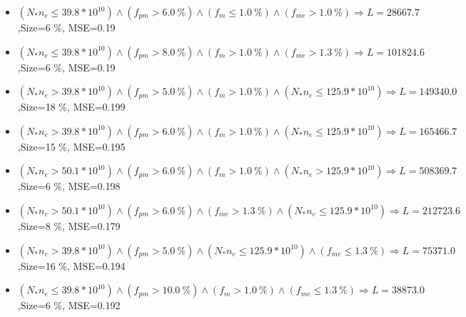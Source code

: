 \documentclass[numbered]{CSL}
\begin{document}
\begin{itemize}
\item $(N_* n_e \leq 39.8 * 10^{10}) \land (f_{pm} > 6.0~\%) \land (f_m \leq 1.0~\%) \land (f_{me} > 1.0~\%) \Rightarrow L = 28667.7$,\hfill Size=6 \%, MSE=0.19
\item $(N_* n_e \leq 39.8 * 10^{10}) \land (f_{pm} > 8.0~\%) \land (f_m > 1.0~\%) \land (f_{me} > 1.3~\%) \Rightarrow L = 101824.6$,\hfill Size=6 \%, MSE=0.19
\item $(N_* n_e > 39.8 * 10^{10}) \land (f_{pm} > 5.0~\%) \land (f_m > 1.0~\%) \land (N_* n_e \leq 125.9 * 10^{10}) \Rightarrow L = 149340.0$,\hfill Size=18 \%, MSE=0.199
\item $(N_* n_e > 39.8 * 10^{10}) \land (f_{pm} > 6.0~\%) \land (f_m > 1.0~\%) \land (N_* n_e \leq 125.9 * 10^{10}) \Rightarrow L = 165466.7$,\hfill Size=15 \%, MSE=0.195
\item $(N_* n_e > 50.1 * 10^{10}) \land (f_{pm} > 6.0~\%) \land (f_m > 1.0~\%) \land (N_* n_e > 125.9 * 10^{10}) \Rightarrow L = 508369.7$,\hfill Size=6 \%, MSE=0.198
\item $(N_* n_e > 50.1 * 10^{10}) \land (f_{pm} > 6.0~\%) \land (f_{me} > 1.3~\%) \land (N_* n_e \leq 125.9 * 10^{10}) \Rightarrow L = 212723.6$,\hfill Size=8 \%, MSE=0.179
\item $(N_* n_e > 39.8 * 10^{10}) \land (f_{pm} > 5.0~\%) \land (N_* n_e \leq 125.9 * 10^{10}) \land (f_{me} \leq 1.3~\%) \Rightarrow L = 75371.0$,\hfill Size=16 \%, MSE=0.194
\item $(N_* n_e \leq 39.8 * 10^{10}) \land (f_{pm} > 10.0~\%) \land (f_m > 1.0~\%) \land (f_{me} \leq 1.3~\%) \Rightarrow L = 38873.0$,\hfill Size=6 \%, MSE=0.192
\end{itemize}
\end{document}
